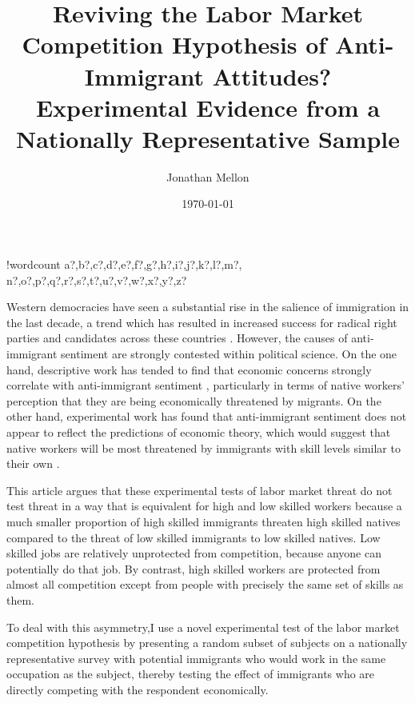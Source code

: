 \documentclass{article}\usepackage[]{graphicx}\usepackage[]{color}
\newcounter{words}
\newenvironment{counted}{%
\setcounter{words}{0}
\SearchList!{wordcount}{\stepcounter{words}}
{a?,b?,c?,d?,e?,f?,g?,h?,i?,j?,k?,l?,m?,
n?,o?,p?,q?,r?,s?,t?,u?,v?,w?,x?,y?,z?}
\UndoBoundary{'}
\SearchOrder{p;}}{%
\StopSearching}
\begin{document}
\title{Reviving the Labor Market Competition Hypothesis of Anti-Immigrant Attitudes? Experimental Evidence from a Nationally Representative Sample}
\author{Jonathan Mellon}
\date{\today}

\maketitle
\begin{counted}



Western democracies have seen a substantial rise in the salience of immigration in the last decade, a trend which has resulted in increased success for radical right parties and candidates across these countries  \cite{Akkerman2012,Dahlstrom2012,Mudde2013,Abou-Chadi2015}. However, the causes of anti-immigrant sentiment are strongly contested within political science. On the one hand, descriptive work has tended to find that economic concerns strongly correlate with anti-immigrant sentiment \autocite{Mayda2006,Dancygier2013,Malhotra2013,Helbling2011,Ford2014}, particularly in terms of native workers' perception that they are being economically threatened by migrants. On the other hand, experimental work has found that anti-immigrant sentiment does not appear to reflect the predictions of economic theory, which would suggest that native workers will be most threatened by immigrants with skill levels similar to their own \autocite{Hainmueller2007,Hainmueller2010,Bohrer2013,Harell2012, Goldstein2014,Hainmueller2015}.


This article argues that these experimental tests of labor market threat do not test threat in a way that is equivalent for high and low skilled workers because a much smaller proportion of high skilled immigrants threaten high skilled natives compared to the threat of low skilled immigrants to low skilled natives. Low skilled jobs are relatively unprotected from competition, because anyone can potentially do that job. By contrast, high skilled workers are protected from almost all competition except from people with precisely the same set of skills as them.


To deal with this asymmetry,I use a novel experimental test of the labor market competition hypothesis by presenting a random subset of subjects on a nationally representative survey with potential immigrants who would work in the same occupation as the subject, thereby testing the effect of immigrants who are directly competing with the respondent economically.


\end{counted}
\end{document}
